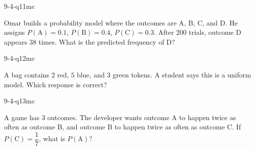\begin{practiceQuestion}{9-4-q11}{mc}
\begin{questionText}
Omar builds a probability model where the outcomes are A, B, C, and D. He assigns $P(\text{A}) = 0.1$, $P(\text{B}) = 0.4$, $P(\text{C}) = 0.3$. After $200$ trials, outcome D appears $38$ times. What is the predicted frequency of D?
\end{questionText}
\end{practiceQuestion}

\begin{practiceQuestion}{9-4-q12}{mc}
\begin{questionText}
A bag contains $2$ red, $5$ blue, and $3$ green tokens. A student says this is a uniform model. Which response is correct?
\end{questionText}
\end{practiceQuestion}

\begin{practiceQuestion}{9-4-q13}{mc}
\begin{questionText}
A game has $3$ outcomes. The developer wants outcome A to happen twice as often as outcome B, and outcome B to happen twice as often as outcome C. If $P(\text{C}) = \dfrac{1}{7}$, what is $P(\text{A})$?
\end{questionText}
\end{practiceQuestion}

